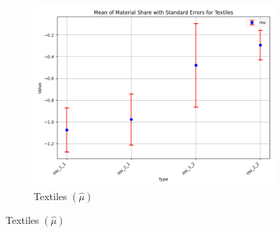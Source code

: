 \documentclass{article}
\begin{document}
\begin{figure}[ht!]
\begin{subfigure}[t]{0.32\textwidth}
        \centering
        \includegraphics[width=\textwidth]{figure/empirical_ar1_mixture_kmshare_ciiu_mu_with_error_bars_Textiles.png}
        \caption{Textiles $(\hat\mu)$}
    \end{subfigure}



\end{figure}
\end{document}
